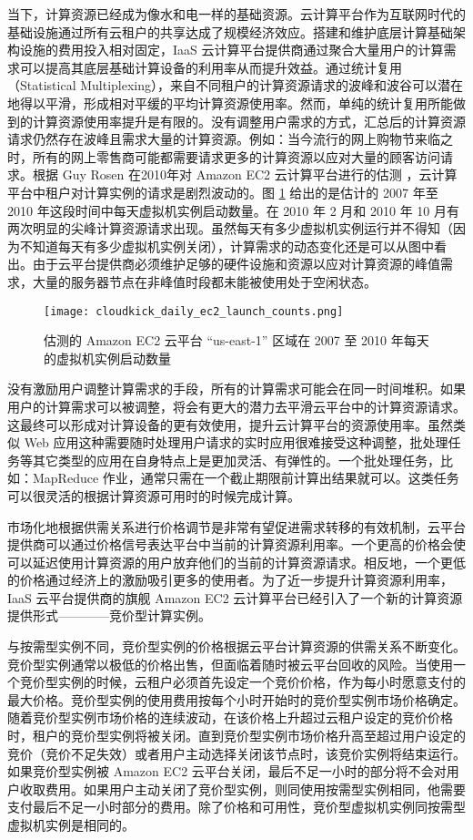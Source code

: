 当下，计算资源已经成为像水和电一样的基础资源。云计算平台作为互联网时代的基础设施通过所有云租户的共享达成了规模经济效应。搭建和维护底层计算基础架构设施的费用投入相对固定，IaaS 云计算平台提供商通过聚合大量用户的计算需求可以提高其底层基础计算设备的利用率从而提升效益。通过统计复用（Statistical Multiplexing），来自不同租户的计算资源请求的波峰和波谷可以潜在地得以平滑，形成相对平缓的平均计算资源使用率。然而，单纯的统计复用所能做到的计算资源使用率提升是有限的。没有调整用户需求的方式，汇总后的计算资源请求仍然存在波峰且需求大量的计算资源。例如：当今流行的网上购物节来临之时，所有的网上零售商可能都需要请求更多的计算资源以应对大量的顾客访问请求。根据 Guy Rosen 在2010年对 Amazon EC2 云计算平台进行的估测 \cite{ec2dailyusage}，云计算平台中租户对计算实例的请求是剧烈波动的。图 \ref{figure:daily_ec2_launch_counts} 给出的是估计的 2007 年至 2010 年这段时间中每天虚拟机实例启动数量。在 2010 年 2 月和 2010 年 10 月有两次明显的尖峰计算资源请求出现。虽然每天有多少虚拟机实例运行并不得知（因为不知道每天有多少虚拟机实例关闭），计算需求的动态变化还是可以从图中看出。由于云平台提供商必须维护足够的硬件设施和资源以应对计算资源的峰值需求，大量的服务器节点在非峰值时段都未能被使用处于空闲状态。
\begin{figure}
  \centering
  \texttt{[image: cloudkick\_daily\_ec2\_launch\_counts.png]}
  \caption{估测的 Amazon EC2 云平台 ``us-east-1'' 区域在 2007 至 2010 年每天的虚拟机实例启动数量 \cite{ec2dailyusage}}
  \label{figure:daily_ec2_launch_counts}
\end{figure}

没有激励用户调整计算需求的手段，所有的计算需求可能会在同一时间堆积。如果用户的计算需求可以被调整，将会有更大的潜力去平滑云平台中的计算资源请求。这最终可以形成对计算设备的更有效使用，提升云计算平台的资源使用率。虽然类似 Web 应用这种需要随时处理用户请求的实时应用很难接受这种调整，批处理任务等其它类型的应用在自身特点上是更加灵活、有弹性的。一个批处理任务，比如：MapReduce 作业，通常只需在一个截止期限前计算出结果就可以。这类任务可以很灵活的根据计算资源可用时的时候完成计算。

市场化地根据供需关系进行价格调节是非常有望促进需求转移的有效机制，云平台提供商可以通过价格信号表达平台中当前的计算资源利用率。一个更高的价格会使可以延迟使用计算资源的用户放弃他们的当前的计算资源请求。相反地，一个更低的价格通过经济上的激励吸引更多的使用者。为了近一步提升计算资源利用率，IaaS 云平台提供商的旗舰 Amazon EC2 云计算平台已经引入了一个新的计算资源提供形式————竞价型计算实例。

与按需型实例不同，竞价型实例的价格根据云平台计算资源的供需关系不断变化。竞价型实例通常以极低的价格出售，但面临着随时被云平台回收的风险。当使用一个竞价型实例的时候，云租户必须首先设定一个竞价价格，作为每小时愿意支付的最大价格。竞价型实例的使用费用按每个小时开始时的竞价型实例市场价格确定。随着竞价型实例市场价格的连续波动，在该价格上升超过云租户设定的竞价价格时，租户的竞价型实例将被关闭。直到竞价型实例市场价格升高至超过用户设定的竞价（竞价不足失效）或者用户主动选择关闭该节点时，该竞价实例将结束运行。如果竞价型实例被 Amazon EC2 云平台关闭，最后不足一小时的部分将不会对用户收取费用。如果用户主动关闭了竞价型实例，则同使用按需型实例相同，他需要支付最后不足一小时部分的费用。除了价格和可用性，竞价型虚拟机实例同按需型虚拟机实例是相同的。

